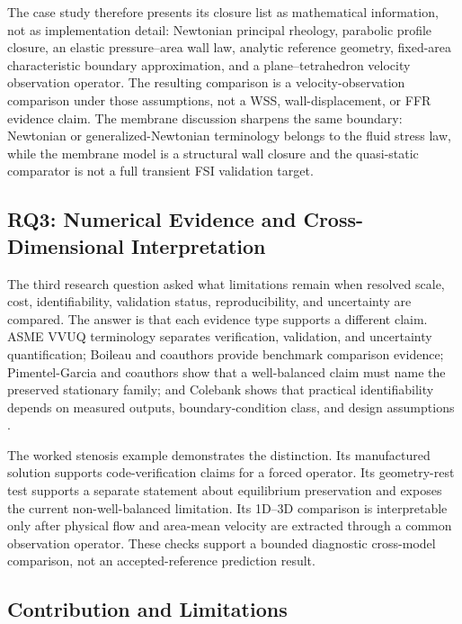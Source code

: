 The case study therefore presents its closure list as mathematical information,
not as implementation detail: Newtonian principal rheology, parabolic
profile closure, an elastic pressure--area wall law, analytic reference
geometry, fixed-area characteristic boundary approximation, and a
plane--tetrahedron velocity observation operator. The resulting comparison is a
velocity-observation comparison under those assumptions, not a WSS,
wall-displacement, or FFR evidence claim.
The membrane discussion sharpens the same boundary: Newtonian or
generalized-Newtonian terminology belongs to the fluid stress law, while the
membrane model is a structural wall closure and the quasi-static comparator is
not a full transient FSI validation target.

\subsection{RQ3: Numerical Evidence and Cross-Dimensional Interpretation}
\label{subsec:discussion-numerical-evidence-observation}

The third research question asked what limitations remain when resolved scale,
cost, identifiability, validation status, reproducibility, and uncertainty are
compared. The answer is that each evidence type supports a different claim.
ASME VVUQ terminology separates verification, validation, and uncertainty
quantification; Boileau and coauthors provide benchmark comparison evidence;
Pimentel-Garcia and coauthors show that a well-balanced claim must name the
preserved stationary family; and Colebank shows that practical identifiability
depends on measured outputs, boundary-condition class, and design assumptions
\cite{ASME2022VVUQTerminology,BoileauEtAl2015Benchmark,PimentelGarciaEtAl2023HighOrderWellBalanced,Colebank2025HemodynamicsIdentifiability}.

The worked stenosis example demonstrates the distinction. Its manufactured
solution supports code-verification claims for a forced operator. Its
geometry-rest test supports a separate statement about equilibrium preservation
and exposes the current non-well-balanced limitation. Its 1D--3D comparison is
interpretable only after physical flow and area-mean velocity are extracted
through a common observation operator. These checks support a bounded
diagnostic cross-model comparison, not an accepted-reference prediction result.

\subsection{Contribution and Limitations}
\label{subsec:discussion-contribution-limitations}

